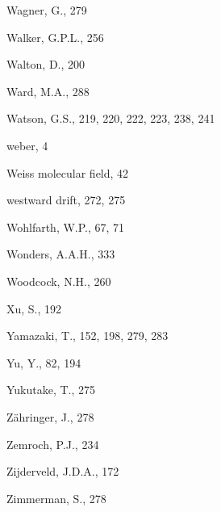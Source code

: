 \documentclass[,plain]{tauxe}
\begin{document}
\begin{theindex}
  \indexspace

  \item Wagner, G., 279
  \item Walker, G.P.L., 256
  \item Walton, D., 200
  \item Ward, M.A., 288
  \item Watson, G.S., 219, 220, 222, 223, 238, 241
  \item weber, 4
  \item Weiss molecular field, 42
  \item westward drift, 272, 275
  \item Wohlfarth, W.P., 67, 71
  \item Wonders, A.A.H., 333
  \item Woodcock, N.H., 260

  \indexspace

  \item Xu, S., 192

  \indexspace

  \item Yamazaki, T., 152, 198, 279, 283
  \item Yu, Y., 82, 194
  \item Yukutake, T., 275

  \indexspace

  \item Z\"ahringer, J., 278
  \item Zemroch, P.J., 234
  \item Zijderveld, J.D.A., 172
  \item Zimmerman, S., 278

\end{theindex}
\end{document}
